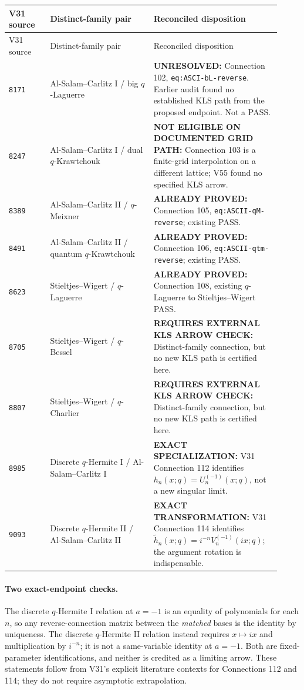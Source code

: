 \documentclass[11pt]{article}
\begin{document}
\begin{longtable}{@{}p{0.14\linewidth}p{0.35\linewidth}p{0.43\linewidth}@{}}
\toprule V31 source & Distinct-family pair & Reconciled disposition \\
\midrule\endfirsthead
\toprule V31 source & Distinct-family pair & Reconciled disposition \\
\midrule\endhead
\bottomrule\endfoot
\texttt{8171} & Al-Salam--Carlitz I / big $q$-Laguerre & \textbf{UNRESOLVED:} Connection 102, \texttt{eq:ASCI-bL-reverse}. Earlier audit found no established KLS path from the proposed endpoint. Not a PASS. \\
\texttt{8247} & Al-Salam--Carlitz I / dual $q$-Krawtchouk & \textbf{NOT ELIGIBLE ON DOCUMENTED GRID PATH:} Connection 103 is a finite-grid interpolation on a different lattice; V55 found no specified KLS arrow. \\
\texttt{8389} & Al-Salam--Carlitz II / $q$-Meixner & \textbf{ALREADY PROVED:} Connection 105, \texttt{eq:ASCII-qM-reverse}; existing PASS. \\
\texttt{8491} & Al-Salam--Carlitz II / quantum $q$-Krawtchouk & \textbf{ALREADY PROVED:} Connection 106, \texttt{eq:ASCII-qtm-reverse}; existing PASS. \\
\texttt{8623} & Stieltjes--Wigert / $q$-Laguerre & \textbf{ALREADY PROVED:} Connection 108, existing $q$-Laguerre to Stieltjes--Wigert PASS. \\
\texttt{8705} & Stieltjes--Wigert / $q$-Bessel & \textbf{REQUIRES EXTERNAL KLS ARROW CHECK:} Distinct-family connection, but no new KLS path is certified here. \\
\texttt{8807} & Stieltjes--Wigert / $q$-Charlier & \textbf{REQUIRES EXTERNAL KLS ARROW CHECK:} Distinct-family connection, but no new KLS path is certified here. \\
\texttt{8985} & Discrete $q$-Hermite I / Al-Salam--Carlitz I & \textbf{EXACT SPECIALIZATION:} V31 Connection 112 identifies $h_n(x;q)=U_n^{(-1)}(x;q)$, not a new singular limit. \\
\texttt{9093} & Discrete $q$-Hermite II / Al-Salam--Carlitz II & \textbf{EXACT TRANSFORMATION:} V31 Connection 114 identifies $\widetilde h_n(x;q)=i^{-n}V_n^{(-1)}(ix;q)$; the argument rotation is indispensable. \\
\end{longtable}

\paragraph{Two exact-endpoint checks.}
The discrete $q$-Hermite I relation at $a=-1$ is an equality of polynomials for each $n$, so any reverse-connection matrix between the \emph{matched} bases is the identity by uniqueness. The discrete $q$-Hermite II relation instead requires $x\mapsto ix$ and multiplication by $i^{-n}$; it is not a same-variable identity at $a=-1$. Both are fixed-parameter identifications, and neither is credited as a limiting arrow. These statements follow from V31's explicit literature contexts for Connections 112 and 114; they do not require asymptotic extrapolation.
\end{document}
